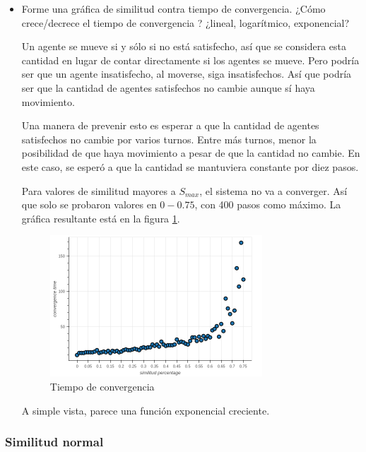 \documentclass{article}
\begin{document}
\begin{itemize}
  \item Forme una gráfica de similitud contra tiempo de convergencia. ¿Cómo
    crece/decrece el tiempo de convergencia ? ¿lineal, logarítmico, exponencial?

    Un agente se mueve si y sólo si no está satisfecho, así que se considera
    esta cantidad en lugar de contar directamente si los agentes se mueve. Pero
    podría ser que un agente insatisfecho, al moverse, siga insatisfechos. Así
    que podría ser que la cantidad de agentes satisfechos no cambie aunque sí
    haya movimiento.

    Una manera de prevenir esto es esperar a que la cantidad de agentes
    satisfechos no cambie por varios turnos. Entre más turnos, menor la
    posibilidad de que haya movimiento a pesar de que la cantidad no cambie.
    En este caso, se esperó a que la cantidad se mantuviera constante por diez
    pasos.

    Para valores de similitud mayores a $S_{max}$, el sistema no va a converger.
    Así que solo se probaron valores en $0-0.75$, con 400 pasos como máximo. La
    gráfica resultante está en la figura \ref{fig:conv-sim}.

    \begin{figure}
    \centering
    \includegraphics[width=0.75\textwidth]{imgs/sim_conv.png}
    \caption{Tiempo de convergencia}
    \label{fig:conv-sim}
    \end{figure}

    A simple vista, parece una función exponencial creciente.

\end{itemize}

\subsubsection{Similitud normal}
\end{document}
